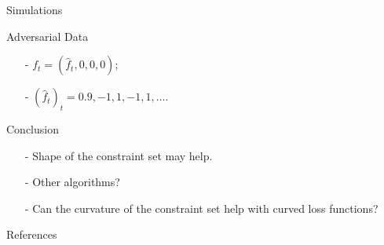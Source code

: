 \documentclass[final]{beamer} %
\newcommand{\hf}{\hat{f}}
\begin{document}
\begin{frame}[c]
\begin{columns}[t,totalwidth=\textwidth]
\begin{column}{0.24\textwidth}
\begin{block}{Simulations}
\begin{minipage}{.9\linewidth}
\begin{block}{Adversarial Data}
					\footnotesize
					\begin{itemize}
						\item[-] $f_t=(\hf_t,0,0,0)$;
						\item[-] $(\hf_t)_t = 0.9, -1,1,-1,1,\ldots$.
					\end{itemize}
					\vspace{-1cm}	
				\end{block}				
			\end{minipage}
		\end{block}
		
		\vspace{0.0ex}
		\begin{block}{Conclusion}	
			\vspace{-0.3cm}
			\begin{itemize}
				\item[-] Shape of the constraint set may help. \medskip
				\item[-] Other algorithms? \medskip
				\item[-] Can the curvature of the constraint set help with curved loss functions?
				\vspace{-0.3cm}
			\end{itemize}
		\end{block}
		\vspace{0.0ex}
		\begin{block}{References}
			\vspace{-0.1cm}
			\tiny
			\begin{center}
			\begin{minipage}{0.97\textwidth}
			\begin{multicols}{2}
			
			
			\end{multicols}
			\end{minipage}
			\end{center}
			\vspace{-0.1cm}
		\end{block}			
	\end{column}
		
	\begin{column}{0.01\textwidth}
	\end{column}
\end{columns}
 
\end{frame}
\end{document}
